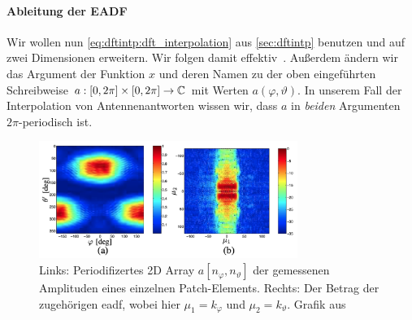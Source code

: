 \paragraph{Ableitung der EADF}
%
%
Wir wollen nun \eqref{eq:dftintp:dft_interpolation} aus \cref{sec:dftintp} benutzen und auf zwei Dimensionen erweitern.
Wir folgen damit effektiv~\cite{landmann2004EADF}.
Au{\ss}erdem \"andern wir das Argument der Funktion $x$ und deren Namen zu der oben eingef\"uhrten Schreibweise $a : [0, 2 \pi] \times [0, 2 \pi] \rightarrow \mathbb{C}$ mit Werten $a(\varphi, \vartheta)$. 
In unserem Fall der Interpolation von Antennenantworten wissen wir, dass $a$ in \emph{beiden} Argumenten $2\pi$-periodisch ist.

\begin{figure}[t]
    \centering\includegraphics[width=0.75\textwidth]{img/eadf/bp_aperture.png}
    \caption{Links: Periodifizertes 2D Array $a[n_\varphi, n_\vartheta]$ der gemessenen Amplituden eines einzelnen Patch-Elements. Rechts: Der Betrag der zugeh\"origen \gls{eadf}, wobei hier $\mu_1 = k_\varphi$ und $\mu_2 = k_\vartheta$. Grafik aus~\cite{landmann2004EADF}}\label{eadf_bp_aperture}
\end{figure}

